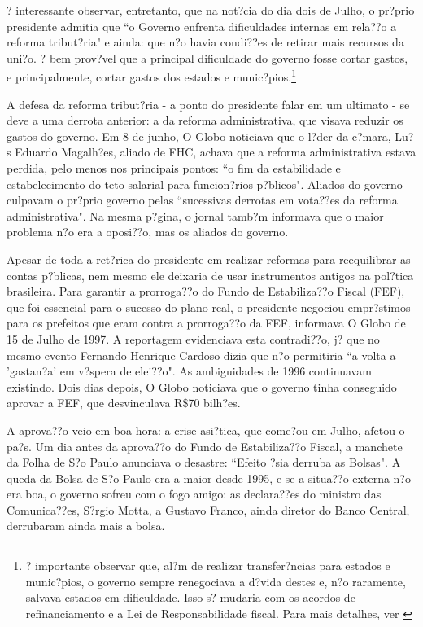 \documentclass{article}
\begin{document}
? interessante observar, entretanto, que na not?cia do dia dois de Julho, o pr?prio presidente admitia que ``o Governo enfrenta dificuldades internas em rela??o a reforma tribut?ria" e ainda: que n?o havia condi??es de retirar mais recursos da uni?o. ? bem prov?vel que a principal dificuldade do governo fosse cortar gastos, e principalmente, cortar gastos dos estados e munic?pios.\footnote{? importante observar que, al?m de realizar transfer?ncias para estados e munic?pios, o governo sempre renegociava a d?vida destes e, n?o raramente, salvava estados em dificuldade. Isso s? mudaria com os acordos de refinanciamento e a Lei de Responsabilidade fiscal. Para mais detalhes, ver \citet{Giambiagi2002}}

A defesa da reforma tribut?ria - a ponto do presidente falar em um ultimato - se deve a uma derrota anterior: a da reforma administrativa, que visava reduzir os gastos do governo. Em 8 de junho, O Globo noticiava que o l?der da c?mara, Lu?s Eduardo Magalh?es, aliado de FHC, achava que a reforma administrativa estava perdida, pelo menos nos principais pontos: ``o fim da estabilidade e estabelecimento do teto salarial para funcion?rios p?blicos". Aliados do governo culpavam o pr?prio governo pelas ``sucessivas derrotas em vota??es da reforma administrativa". Na mesma p?gina, o jornal tamb?m informava que o maior problema n?o era a oposi??o, mas os aliados do governo. 

Apesar de toda a ret?rica do presidente em realizar reformas para reequilibrar as contas p?blicas, nem mesmo ele deixaria de usar instrumentos antigos na pol?tica brasileira. Para garantir a prorroga??o do Fundo de Estabiliza??o Fiscal (FEF), que foi essencial para o sucesso do plano real, o presidente negociou empr?stimos para os prefeitos que eram contra a prorroga??o da FEF, informava O Globo de 15 de Julho de 1997. A reportagem evidenciava esta contradi??o, j? que no mesmo evento Fernando Henrique Cardoso dizia que n?o permitiria ``a volta a 'gastan?a' em v?spera de elei??o". As ambiguidades de 1996 continuavam existindo. Dois dias depois, O Globo noticiava que o governo tinha conseguido aprovar a FEF, que desvinculava R\$70 bilh?es. 

A aprova??o veio em boa hora: a crise asi?tica, que come?ou em Julho, afetou o pa?s. Um dia antes da aprova??o do Fundo de Estabiliza??o Fiscal, a manchete da Folha de S?o Paulo anunciava o desastre: ``Efeito ?sia derruba as Bolsas". A queda da Bolsa de S?o Paulo era a maior desde 1995, e se a situa??o externa n?o era boa, o governo sofreu com o fogo amigo: as declara??es do ministro das Comunica??es, S?rgio Motta, a Gustavo Franco, ainda diretor do Banco Central, derrubaram ainda mais a bolsa. 
\end{document}
